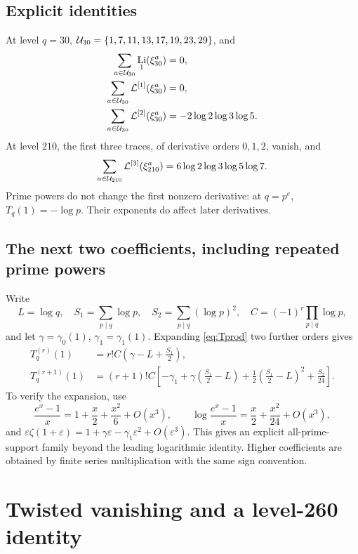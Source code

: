 \documentclass[11pt]{article}
\numberwithin{equation}{section}
\theoremstyle{definition}\newtheorem{definition}[theorem]{Definition}
\theoremstyle{remark}\newtheorem{remark}[theorem]{Remark}
\DeclareMathOperator{\Li}{Li}
\newcommand{\eps}{\varepsilon}
\newcommand{\Liord}[2]{\mathcal L^{[#1]}(#2)}
\begin{document}
\subsection{Explicit identities}

At level $q=30$, $\mathcal U_{30}=\{1,7,11,13,17,19,23,29\}$, and
\begin{align}\label{eq:q30}
\sum_{a\in\U_{30}}\Li_1(\xi_{30}^a)&=0,\\
\sum_{a\in\U_{30}}\Liord{1}{\xi_{30}^a}&=0,\\
\sum_{a\in\U_{30}}\Liord{2}{\xi_{30}^a}
&=-2\log2\log3\log5.
\end{align}
At level $210$, the first three traces, of derivative orders $0,1,2$,
vanish, and
\begin{equation}\label{eq:q210}
\sum_{a\in\U_{210}}\Liord{3}{\xi_{210}^a}
=6\log2\log3\log5\log7.
\end{equation}
Prime powers do not change the first nonzero derivative: at $q=p^e$,
$T_q(1)=-\log p$. Their exponents do affect later derivatives.

\subsection{The next two coefficients, including repeated prime powers}

Write
\[
L=\log q,\quad S_1=\sum_{p\mid q}\log p,\quad
S_2=\sum_{p\mid q}(\log p)^2,
\quad C=(-1)^r\prod_{p\mid q}\log p,
\]
and let $\gamma=\gamma_0(1)$, $\gamma_1=\gamma_1(1)$.
Expanding \eqref{eq:Tprod} two further orders gives
\begin{align}\label{eq:Tnext}
T_q^{(r)}(1)
&=r!C\left(\gamma-L+\frac{S_1}{2}\right),\\
T_q^{(r+1)}(1)
&=(r+1)!C\left[-\gamma_1+
\gamma\left(\frac{S_1}{2}-L\right)
+\frac12\left(\frac{S_1}{2}-L\right)^2+\frac{S_2}{24}\right].
\end{align}
To verify the expansion, use
\[
\frac{e^x-1}{x}=1+\frac x2+\frac{x^2}{6}+O(x^3),\qquad
\log\frac{e^x-1}{x}=\frac x2+\frac{x^2}{24}+O(x^3),
\]
and $\eps\zeta(1+\eps)=1+\gamma\eps-\gamma_1\eps^2+O(\eps^3)$.
This gives an explicit all-prime-support family beyond the leading
logarithmic identity. Higher coefficients are obtained by finite series
multiplication with the same sign convention.

\section{Twisted vanishing and a level-260 identity}
\end{document}
